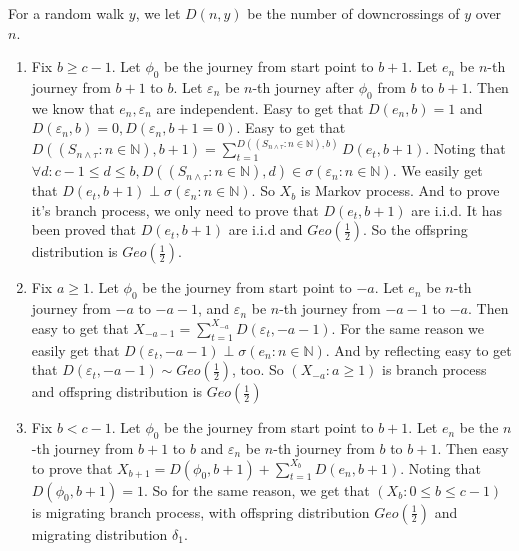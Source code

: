 \documentclass{ctexart}
\begin{document}
\begin{solution}
  For a random walk \(y\), we let \(D(n,y)\) be the number of downcrossings of \(y\) over \(n\).
  \begin{enumerate}
    \item Fix \(b \geq c-1\). Let \(\phi_0\) be the journey from start point to \(b+1\).
      Let \(e_n\) be \(n\)-th journey from \(b+1\) to \(b\).
      Let \(\varepsilon_n\) be \(n\)-th journey after \(\phi_0\) from \(b\) to \(b+1\).
      Then we know that \(e_n,\varepsilon_n\) are independent.
      Easy to get that \(D(e_n,b)=1\) and \(D(\varepsilon_n,b)=0,D(\varepsilon_n,b+1=0)\).
      Easy to get that \(D((S_{n \wedge \tau}:n \in \mathbb{N}),b+1)=\sum_{t=1}^{D((S_{n \wedge \tau}:n \in \mathbb{N}),b)} D(e_t,b+1) \).
      Noting that \(\forall d:c-1 \leq d \leq b,D((S_{n \wedge \tau}:n \in \mathbb{N}),d) \in \sigma(\varepsilon_n:n \in \mathbb{N})\).
      We easily get that \(D(e_t,b+1) \perp \sigma(\varepsilon_n:n \in \mathbb{N})\).
      So \(X_b\) is Markov process. And to prove it's branch process, we only need to prove that \(D(e_t,b+1)\) are i.i.d.
      It has been proved that \(D(e_t,b+1)\) are i.i.d and \(Geo(\frac{1}{2})\).
      So the offspring distribution is \(Geo(\frac{1}{2})\).
    \item Fix \(a \geq 1\). Let \(\phi_0\) be the journey from start point to \(-a\).
      Let \(e_n\) be \(n\)-th journey from \(-a\) to \(-a-1\), and \(\varepsilon_n\) be \(n\)-th journey from \(-a-1\) to \(-a\).
      Then easy to get that \(X_{-a-1}=\sum_{t=1}^{X_{-a}} D(\varepsilon_t,-a-1)\).
      For the same reason we easily get that \(D(\varepsilon_t,-a-1)\perp \sigma(e_n:n \in \mathbb{N})\).
      And by reflecting easy to get that \(D(\varepsilon_t,-a-1) \sim Geo(\frac{1}{2})\), too.
      So \((X_{-a}:a \geq 1)\) is branch process
      and offspring distribution is \(Geo(\frac{1}{2})\)

    \item Fix \(b<c-1\). Let \(\phi_0\) be the journey from start point to \(b+1\).
      Let \(e_n\) be the \(n\)-th journey from \(b+1\) to \(b\) and \(\varepsilon_n\) be \(n\)-th journey from \(b\) to \(b+1\).
      Then easy to prove that \(X_{b+1}=D(\phi_0,b+1)+\sum_{t=1}^{X_b} D(e_n,b+1)\).
      Noting that \(D(\phi_0,b+1)=1\). So for the same reason, we get that \((X_b:0 \leq b \leq c-1)\) is migrating branch process,
      with offspring distribution \(Geo(\frac{1}{2})\) and migrating distribution \(\delta_1\).
  \end{enumerate}
\end{solution}
\end{document}
